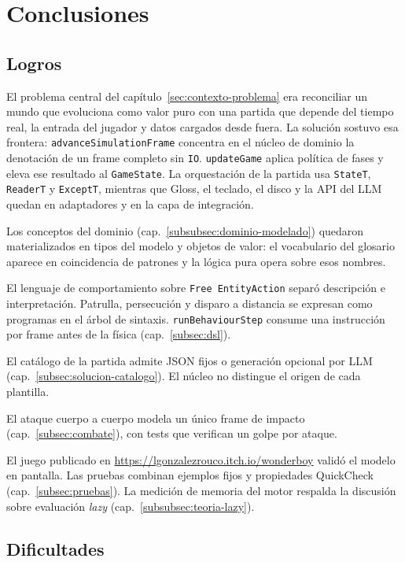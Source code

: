 \section{Conclusiones}
\label{sec:conclusiones}

\subsection{Logros}
\label{subsec:conclusiones-logros}

El problema central del capítulo~\ref{sec:contexto-problema} era reconciliar un
mundo que evoluciona como valor puro con una partida que depende del tiempo real, la
entrada del jugador y datos cargados desde fuera. La solución sostuvo esa frontera:
\texttt{advanceSimulationFrame} concentra en el núcleo de dominio la denotación de
un frame completo sin \texttt{IO}. \texttt{updateGame} aplica política de fases y eleva
ese resultado al \texttt{GameState}. La orquestación de la partida usa
\texttt{StateT}, \texttt{ReaderT} y \texttt{ExceptT}, mientras que Gloss, el teclado, el
disco y la API del LLM quedan en adaptadores y en la capa de integración.

Los conceptos del dominio (cap.~\ref{subsubsec:dominio-modelado}) quedaron
materializados en tipos del modelo y objetos de valor: el vocabulario del glosario
aparece en coincidencia de patrones y la lógica pura opera sobre esos nombres.

El lenguaje de comportamiento sobre \texttt{Free EntityAction} separó descripción e
interpretación. Patrulla, persecución y disparo a distancia se expresan como programas
en el árbol de sintaxis. \texttt{runBehaviourStep} consume una instrucción por frame antes de la
física (cap.~\ref{subsec:dsl}).

El catálogo de la partida admite JSON fijos o generación opcional por LLM
(cap.~\ref{subsec:solucion-catalogo}). El núcleo no distingue el origen de cada plantilla.

El ataque cuerpo a cuerpo modela un único frame de impacto
(cap.~\ref{subsec:combate}), con tests que verifican un golpe por ataque.

El juego publicado en \url{https://lgonzalezrouco.itch.io/wonderboy} validó el modelo en
pantalla. Las pruebas combinan ejemplos fijos y propiedades QuickCheck
(cap.~\ref{subsec:pruebas}). La medición de memoria del motor respalda la discusión sobre
evaluación \textit{lazy} (cap.~\ref{subsubsec:teoria-lazy}).

\subsection{Dificultades}
\label{subsec:conclusiones-dificultades}

